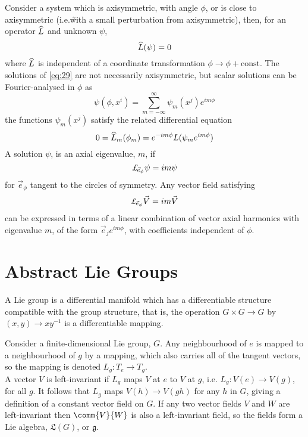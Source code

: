 Consider a system which is axisymmetric, with angle $\phi$, or is
close to axisymmetric (i.e.\~with a small perturbation from
axisymmetric), then, for an operator ${\widehat{L}}$ and unknown $\psi$,
\begin{equation}
  \label{eq:29}
  {\widehat{L}}(\psi) = 0
\end{equation}
where ${\widehat{L}}$ is independent of a coordinate transformation $\phi \to
\phi + \textrm{const}$. The solutions of \eqref{eq:29} are not
necessarily axisymmetric, but scalar solutions can be Fourier-analysed
in $\phi$ as
\begin{equation}
  \label{eq:30}
  \psi(\phi, x^i) = \sum_{m=-\infty}^{\infty} \psi_m(x^j) e^{i m \phi}
\end{equation}
the functions $\psi_m(x^j)$ satisfy the related differential equation
\begin{equation}
  \label{eq:31}
  0 = {\widehat{L}}_m(\phi_m) = e^{-i m \phi} L(\psi_m e^{im\phi})
\end{equation}
A solution $\psi$, is an axial eigenvalue, $m$, if
\begin{equation}
  \label{eq:32}
  \ld{\vec{e}_{\phi}} \psi = i m \psi
\end{equation}
for $\vec{e}_{\phi}$ tangent to the circles of symmetry. Any vector
field satisfying 
\[ \ld{\vec{e}_{\phi}}{\vec{V}} = i m \vec{V} \] can be expressed in
terms of a linear combination of vector axial harmonics with
eigenvalue $m$, of the form $\vec{e}_j e^{i m \phi}$, with
coefficients independent of $\phi$.

\section{Abstract Lie Groups}
\label{sec:abstract-lie-groups}

A Lie group is a differential manifold which has a differentiable
structure compatible with the group structure, that is, the operation
$G \times G \to G$ by $(x,y) \to x y^{-1}$ is a differentiable mapping.

Consider a finite-dimensional Lie group, $G$. Any neighbourhood of $e$
is mapped to a neighbourhood of $g$ by a mapping, which also carries
all of the tangent vectors, so the mapping is denoted $L_g : T_e \to
T_g$.\\
A vector $V$ is left-invariant if $L_g$ maps $V$ at $e$ to $V$ at $g$,
i.e. $L_g: V(e) \to V(g)$, for all $g$. It follows that $L_g$ maps
$V(h) \to V(gh)$ for any $h$ in $G$, giving a definition of a constant
vector field on $G$. If any two vector fields $V$ and $W$ are
left-invariant then $\comm{V}{W}$ is also a left-invariant field, so
the fields form a Lie algebra, $\mathfrak{L}(G)$, or $\mathfrak{g}$.

